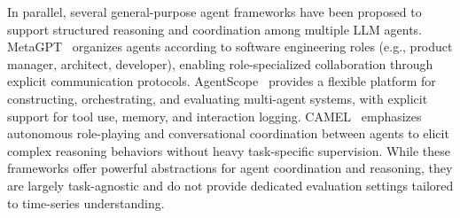 In parallel, several general-purpose agent frameworks have been proposed to support structured reasoning and coordination among multiple LLM agents.
MetaGPT~\cite{hong2024metagpt} organizes agents according to software engineering roles (e.g., product manager, architect, developer), enabling role-specialized collaboration through explicit communication protocols.
AgentScope~\cite{gao2024agentscope} provides a flexible platform for constructing, orchestrating, and evaluating multi-agent systems, with explicit support for tool use, memory, and interaction logging.
CAMEL~\cite{li2023camel} emphasizes autonomous role-playing and conversational coordination between agents to elicit complex reasoning behaviors without heavy task-specific supervision.
While these frameworks offer powerful abstractions for agent coordination and reasoning, they are largely task-agnostic and do not provide dedicated evaluation settings tailored to time-series understanding.

